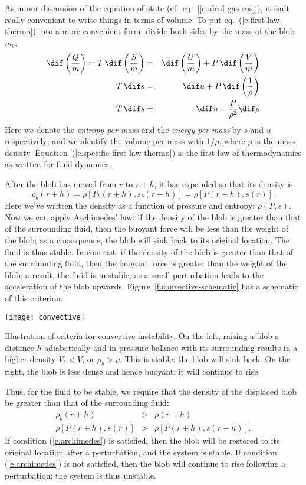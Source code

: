 As in our discussion of the equation of state (cf.\ eq.~[\ref{e.ideal-gas-eos}]), it isn't really convenient to write things in terms of volume. To put eq.~(\ref{e.first-law-thermo}) into a more convenient form, divide both sides by the mass of the blob $m_{b}$:
\begin{eqnarray}
	\dif\left(\frac{Q}{m}\right) = T\,\dif\left(\frac{S}{m}\right) &=&
		\dif\left(\frac{U}{m}\right) + P\,\dif\left(\frac{V}{m}\right)\nonumber\\
	T\,\dif s &=& \dif u + P\,\dif\left(\frac{1}{\rho}\right)\nonumber\\
	T\,\dif s &=& \dif u - \frac{P}{\rho^{2}}\dif\rho \label{e.specific-first-law-thermo}
\end{eqnarray}
Here we denote the \emph{entropy per mass} and the \emph{energy per mass} by $s$ and $u$ respectively; and we identify the volume per mass with $1/\rho$, where $\rho$ is the mass density. Equation~(\ref{e.specific-first-law-thermo}) is the first law of thermodynamics as written for fluid dynamics.

After the blob has moved from $r$ to $r+h$, it has expanded so that its density is
\[
	\rho_{b}(r+h) = \rho[P_{b}(r+h),s_{b}(r+h)] = \rho[P(r+h),s(r)].
\]
Here we've written the density as a function of pressure and entropy: $\rho(P,s)$. Now we can apply Archimedes' law: if the density of the blob is greater than that of the surrounding fluid, then the buoyant force will be less than the weight of the blob; as a consequence, the blob will sink back to its original location. The fluid is thus stable. In contrast, if the density of the blob is greater than that of the surrounding fluid, then the buoyant force is greater than the weight of the blob; a result, the fluid is unstable, as a small perturbation leads to the acceleration of the blob upwards. Figure~\ref{f.convective-schematic} has a schematic of this criterion.
\begin{marginfigure}
\texttt{[image: convective]}
\caption[Illustration of criteria for convective instability]{\label{f.convective-schematic}Illustration of criteria for convective instability.  On the left, raising a blob a distance $h$ adiabatically and in pressure balance with its surrounding results in a higher density $V_{b} < V$, or $\rho_{b} > \rho$.  This is stable: the blob will sink back.  On the right, the blob is less dense and hence buoyant: it will continue to rise.}
\end{marginfigure}

Thus, for the fluid to be stable, we require that the density of the displaced blob be greater than that of the surrounding fluid:
\begin{eqnarray}
\rho_{b}(r+h) &>& \rho(r+h) \nonumber\\
\rho[P(r+h),s(r)] &>& \rho[P(r+h),s(r+h)].
\label{e.archimedes}
\end{eqnarray}
If condition (\ref{e.archimedes}) is satisfied, then the blob will be restored to its original location after a perturbation, and the system is stable. If condition (\ref{e.archimedes}) is not satisfied, then the blob will continue to rise following a perturbation; the system is thus unstable.

